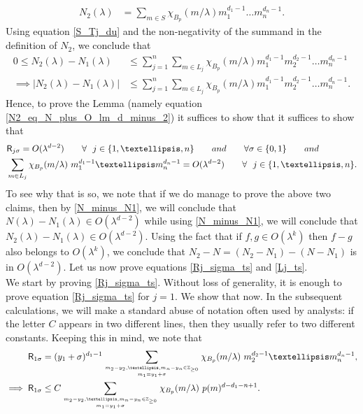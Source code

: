 \documentclass[11pt,lettersize,reqno,fullpage]{amsart}
\providecommand \hf{\hspace*{0.5cm}}
\begin{document}
\begin{align} 
N_2(\lambda)& = \sum_{m\in S} \chi_{B_p}(m/\lambda) m_1^{d_1-1} \ldots m_n^{d_n-1}.
\end{align} 
Using equation \eqref{S_Tj_du} and the non-negativity of the summand in the definition of $N_2$, 
we conclude that 
\begin{align}
0 \leq N_2(\lambda) - N_1(\lambda) &\leq \sum_{j=1}^{n} \sum_{m\in L_j}   
\chi_{B_p}(m/\lambda) m_1^{d_1-1} m_2^{d_2-1} \ldots m_n^{d_n-1} \nonumber \\ 
\implies \big|N_2(\lambda) - N_1(\lambda)\big| &\leq 
\sum_{j=1}^{n} \sum_{m\in L_j}   
\chi_{B_p}(m/\lambda) m_1^{d_1-1} m_2^{d_2-1} \ldots m_n^{d_n-1}.
\label{N2_minus_N1}
\end{align}
Hence, to prove the Lemma 
(namely equation \eqref{N2_eq_N_plus_O_lm_d_minus_2})
it suffices to show that   
it suffices to show that  
\begin{align}
&\mathsf{R}_{j\sigma}  = O(\lambda^{d-2}) \qquad \forall ~~j \in \{1, \ldots, n\} 
\qquad \textnormal{and} \qquad \forall \sigma \in \{0, 1\} \qquad \textnormal{and} \label{Rj_sigma_ts}\\ 
& \sum_{m \in L_j} \chi_{B_p} (m/\lambda)\ m_1^{d_1-1} \ldots m_n^{d_n-1} = O(\lambda^{d-2}) 
\qquad  \forall ~~j \in \{1, \ldots, n\}. \label{Lj_ts}
\end{align}
To see why that is so, we note that if we do manage to prove the above two claims, then 
by \eqref{N_minus_N1}, we will conclude that $N(\lambda)-N_1(\lambda) \in O(\lambda^{d-2})$ 
while using \eqref{N_minus_N1}, we will conclude that   
$N_2(\lambda)-N_1(\lambda) \in O(\lambda^{d-2})$. Using the fact that if $f , g \in O(\lambda^k)$ 
then $f-g$ also belongs to $O(\lambda^k)$, we conclude that 
$N_2-N = (N_2-N_1)-(N-N_1)$ is in $O(\lambda^{d-2})$. Let us now prove equations 
\eqref{Rj_sigma_ts} and \eqref{Lj_ts}.   \\
\hf \hf We start by proving \eqref{Rj_sigma_ts}.
Without loss of generality, it 
is enough to prove equation \eqref{Rj_sigma_ts} for $j=1$. 
We show that now. 
In the subsequent calculations, we will make a standard abuse of notation often used by analysts: if the letter 
$C$ appears in two different lines, then they usually refer to two different constants. 
Keeping this in mind, we note that 
\begin{align} 
\mathsf{R}_{1\sigma} & = (y_1 + \sigma)^{d_1-1}
\sum_{{m_2 - y_2, \ldots ,m_n-y_n \in \mathbb{Z}_{\geq 0}}\atop {m_1 = y_1+\sigma}}\chi_{B_p}(m/\lambda) \ m_2^{d_2-1} \ldots m_n^{d_n-1}, \label{R_1_zeroth}\\ 
\implies \mathsf{R}_{1\sigma} 
& \leq C\sum_{{m_2 - y_2, \ldots ,m_n-y_n \in \mathbb{Z}_{\geq 0}}\atop {m_1 = y_1+\sigma}}\chi_{B_p}(m/\lambda) \ p(m)^{d-d_1-n+1}. \label{R_1_sigma_leq_C_t} 
\end{align}
\end{document}
